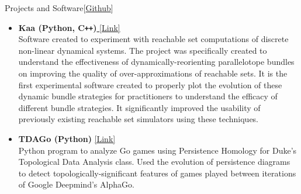 \documentclass{resume} %
\begin{document}
\begin{rSection}{Projects and Software[\href{https://github.com/ekim1919}{Github}]}
  \begin{itemize}[leftmargin=*]
    \item {\bf Kaa (Python, C\verb!++!)}\href{https://github.com/Tarheel-Formal-Methods/kaa-dynamic}{ [Link] } \\
        Software created to experiment with reachable set computations of discrete non-linear dynamical systems. The project was specifically created to understand the effectiveness of dynamically-reorienting parallelotope bundles on improving the quality of over-approximations of reachable sets. It is the first experimental software created to properly plot the evolution of these dynamic bundle strategies for practitioners to understand the efficacy of different bundle strategies. It significantly improved the usability of previously existing reachable set simulators using these techniques.

    \item
        {\bf TDAGo (Python)} \href{https://github.com/ekim1919/TDAGo}{ [Link] }\\
        Python program to analyze Go games using Persistence Homology for Duke's Topological Data Analysis class. Used the evolution of persistence diagrams to detect topologically-significant features of games played between iterations of Google Deepmind's AlphaGo. \newline

  \end{itemize}
\end{rSection}
\end{document}
